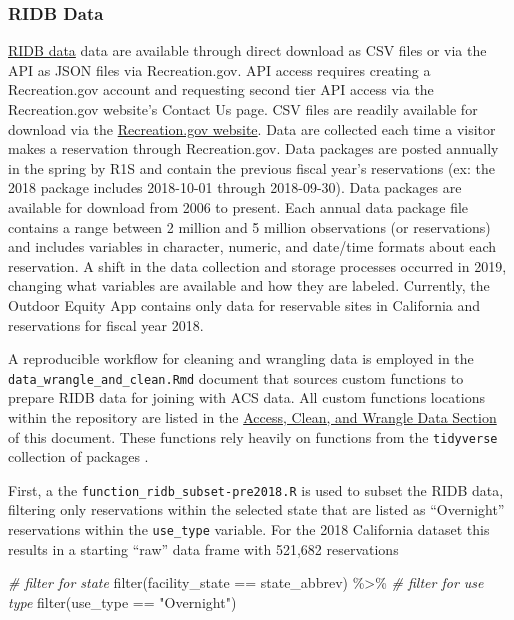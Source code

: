 \documentclass[
]{book}
\newenvironment{Shaded}{\begin{snugshade}}{\end{snugshade}}
\newcommand{\CommentTok}[1]{\textcolor[rgb]{0.56,0.35,0.01}{\textit{#1}}}
\newcommand{\FunctionTok}[1]{\textcolor[rgb]{0.00,0.00,0.00}{#1}}
\newcommand{\NormalTok}[1]{#1}
\newcommand{\SpecialCharTok}[1]{\textcolor[rgb]{0.00,0.00,0.00}{#1}}
\newcommand{\StringTok}[1]{\textcolor[rgb]{0.31,0.60,0.02}{#1}}
\begin{document}
\hypertarget{ridb-data}{%
\subsubsection{RIDB Data}\label{ridb-data}}

\href{https://ridb.recreation.gov/landing}{RIDB data} data are available through direct download as CSV files or via the API as JSON files via Recreation.gov. API access requires creating a Recreation.gov account and requesting second tier API access via the Recreation.gov website's Contact Us page. CSV files are readily available for download via the \href{https://ridb.recreation.gov/download}{Recreation.gov website}. Data are collected each time a visitor makes a reservation through Recreation.gov. Data packages are posted annually in the spring by R1S and contain the previous fiscal year's reservations (ex: the 2018 package includes 2018-10-01 through 2018-09-30). Data packages are available for download from 2006 to present. Each annual data package file contains a range between 2 million and 5 million observations (or reservations) and includes variables in character, numeric, and date/time formats about each reservation. A shift in the data collection and storage processes occurred in 2019, changing what variables are available and how they are labeled. Currently, the Outdoor Equity App contains only data for reservable sites in California and reservations for fiscal year 2018.

A reproducible workflow for cleaning and wrangling data is employed in the \texttt{data\_wrangle\_and\_clean.Rmd} document that sources custom functions to prepare RIDB data for joining with ACS data. All custom functions locations within the repository are listed in the \protect\hyperlink{access-clean-and-wrangle-data}{Access, Clean, and Wrangle Data Section} of this document. These functions rely heavily on functions from the \texttt{tidyverse} collection of packages \citep{R-tidyverse}.

First, a the \texttt{function\_ridb\_subset-pre2018.R} is used to subset the RIDB data, filtering only reservations within the selected state that are listed as ``Overnight'' reservations within the \texttt{use\_type} variable. For the 2018 California dataset this results in a starting ``raw'' data frame with 521,682 reservations

\begin{Shaded}
\begin{Highlighting}[]
\CommentTok{\# filter for state}
\FunctionTok{filter}\NormalTok{(facility\_state }\SpecialCharTok{==}\NormalTok{ state\_abbrev) }\SpecialCharTok{\%\textgreater{}\%}
  \CommentTok{\# filter for use type}
  \FunctionTok{filter}\NormalTok{(use\_type }\SpecialCharTok{==} \StringTok{"Overnight"}\NormalTok{)}
\end{Highlighting}
\end{Shaded}
\end{document}
